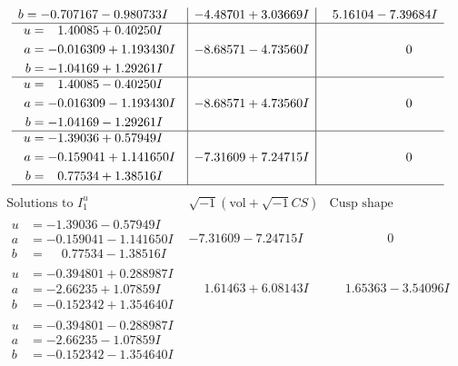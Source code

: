\documentclass[1p]{elsarticle_modified}
\theoremstyle{definition}
\newcommand{\I}{\sqrt{-1}}
\begin{document}
$$\begin{array}{c|c|c}
\begin{aligned}
b &= -0.707167 - 0.980733 I\end{aligned}
 & -4.48701 + 3.03669 I & \phantom{-}5.16104 - 7.39684 I \\ \hline\begin{aligned}
u &= \phantom{-}1.40085 + 0.40250 I \\
a &= -0.016309 + 1.193430 I \\
b &= -1.04169 + 1.29261 I\end{aligned}
 & -8.68571 - 4.73560 I & \phantom{-0.000000 } 0 \\ \hline\begin{aligned}
u &= \phantom{-}1.40085 - 0.40250 I \\
a &= -0.016309 - 1.193430 I \\
b &= -1.04169 - 1.29261 I\end{aligned}
 & -8.68571 + 4.73560 I & \phantom{-0.000000 } 0 \\ \hline\begin{aligned}
u &= -1.39036 + 0.57949 I \\
a &= -0.159041 + 1.141650 I \\
b &= \phantom{-}0.77534 + 1.38516 I\end{aligned}
 & -7.31609 + 7.24715 I & \phantom{-0.000000 } 0\\
 \hline 
 \end{array}$$\newpage$$\begin{array}{c|c|c}  
\text{Solutions to }I^u_{1}& \I (\text{vol} + \sqrt{-1}CS) & \text{Cusp shape}\\
 \hline 
\begin{aligned}
u &= -1.39036 - 0.57949 I \\
a &= -0.159041 - 1.141650 I \\
b &= \phantom{-}0.77534 - 1.38516 I\end{aligned}
 & -7.31609 - 7.24715 I & \phantom{-0.000000 } 0 \\ \hline\begin{aligned}
u &= -0.394801 + 0.288987 I \\
a &= -2.66235 + 1.07859 I \\
b &= -0.152342 + 1.354640 I\end{aligned}
 & \phantom{-}1.61463 + 6.08143 I & \phantom{-}1.65363 - 3.54096 I \\ \hline\begin{aligned}
u &= -0.394801 - 0.288987 I \\
a &= -2.66235 - 1.07859 I \\
b &= -0.152342 - 1.354640 I\end{aligned}

\end{array}$$
\end{document}
